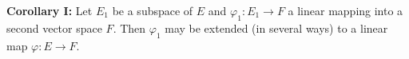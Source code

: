 \textbf{Corollary I:} Let $E_1$ be a subspace of $E$ and $\varphi_1: E_1 \to F$ a linear mapping into a second vector space $F$. Then $\varphi_1$ may be extended (in several ways) to a linear map $\varphi: E \to F$.
